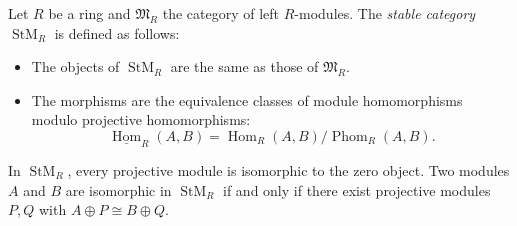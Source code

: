 Let $R$ be a ring and $\mathfrak{M}_R$ the category of left $R$-modules. The {\it stable category} $\operatorname{StM}_R$ is defined as follows:
\begin{itemize}
\item The objects of $\operatorname{StM}_R$ are the same as those of $\mathfrak{M}_R$.
\item The morphisms are the equivalence classes of module homomorphisms modulo projective homomorphisms:
\[
\underline{\operatorname{Hom}}_R(A, B) = \operatorname{Hom}_R(A, B) / \operatorname{Phom}_R(A, B).
\]
\end{itemize}
In $\operatorname{StM}_R$, every projective module is isomorphic to the zero object. Two modules $A$ and $B$ are isomorphic in $\operatorname{StM}_R$ if and only if there exist projective modules $P, Q$ with $A \oplus P \cong B \oplus Q$.

